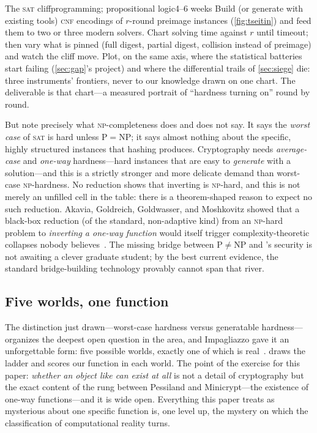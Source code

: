 \begin{project}{The \textsc{sat} cliff}{programming; propositional
  logic}{4--6 weeks}
  Build (or generate with existing tools) \textsc{cnf} encodings of
  $r$-round \SHA{} preimage instances (\cref{fig:tseitin}) and feed
  them to two or three modern solvers. Chart solving time against $r$
  until timeout; then vary what is pinned (full digest, partial digest,
  collision instead of preimage) and watch the cliff move. Plot, on the
  same axis, where the statistical batteries start failing
  (\cref{sec:gap}'s project) and where the differential trails of
  \cref{sec:siege} die: three instruments' frontiers, never to our
  knowledge drawn on one chart. The deliverable is that chart---a
  measured portrait of ``hardness turning on'' round by round.
\end{project}

But note precisely what \textsc{np}-completeness does and does not say.
It says the \emph{worst case} of \textsc{sat} is hard unless
$\mathrm{P}=\mathrm{NP}$; it says almost nothing about the specific,
highly structured instances that hashing produces. Cryptography needs
\emph{average-case} and \emph{one-way} hardness---hard instances that are
easy to \emph{generate} with a solution---and this is a strictly stronger
and more delicate demand than worst-case \textsc{np}-hardness. No
reduction shows that inverting \SHA{} is \textsc{np}-hard, and this is
not merely an unfilled cell in the table: there is a theorem-shaped
reason to expect no such reduction. Akavia, Goldreich, Goldwasser, and
Moshkovitz showed that a black-box reduction (of the standard,
non-adaptive kind) from an \textsc{np}-hard problem to \emph{inverting a
one-way function} would itself trigger complexity-theoretic collapses
nobody believes~\citep{AkaviaGGM2006}. The missing bridge between
$\mathrm{P} \ne \mathrm{NP}$ and \SHA{}'s security is not awaiting a
clever graduate student; by the best current evidence, the standard
bridge-building technology provably cannot span that river.

\subsection{Five worlds, one function}\label{sec:worlds}

The distinction just drawn---worst-case hardness versus generatable
hardness---organizes the deepest open question in the area, and
Impagliazzo gave it an unforgettable form: five possible worlds, exactly
one of which is real~\citep{Impagliazzo1995}.  draws
the ladder and scores our function in each world. The point of the
exercise for this paper: \emph{whether an object like \SHA{} can exist
at all} is not a detail of cryptography but the exact content of the
rung between Pessiland and Minicrypt---the existence of one-way
functions---and it is wide open. Everything this paper treats as
mysterious about one specific function is, one level up, the mystery on
which the classification of computational reality turns.

